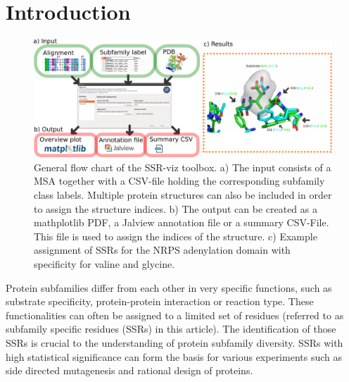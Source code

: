 \documentclass{bioinfo}
\begin{document}
\maketitle

\section{Introduction}
\begin{figure}[!tpb]%
\includegraphics[width=\textwidth]{flow_chart} %
\caption{General flow chart of the SSR-viz toolbox. a) The input consists 
of a MSA together with a CSV-file holding the corresponding subfamily class labels. 
Multiple protein structures can also be included in order to assign the 
structure indices. b) The output can be created as a mathplotlib PDF, a Jalview annotation file
or a summary CSV-File. This file is used to assign the indices of the structure.
c) Example assignment of SSRs for the NRPS adenylation domain with specificity for valine and glycine.   
}\label{fig:01}
\end{figure}
Protein subfamilies differ from each other in very specific functions, such as substrate specificity,
protein-protein interaction or reaction type. These functionalities can often be assigned 
to a limited set of residues (referred to as subfamily specific residues (SSRs) in this article).
The identification of those SSRs is crucial to the understanding of protein subfamily diversity.
SSRs with high statistical significance can form the basis for various experiments 
such as side directed mutagenesis and rational design of proteins. \\
\end{document}
